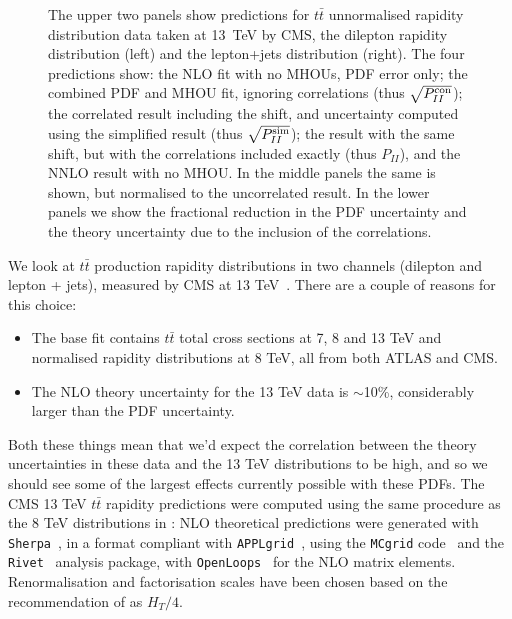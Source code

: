 \begin{figure}[H]
  \caption{The upper two panels show predictions for $t\bar{t}$ unnormalised rapidity distribution data taken at 13~TeV by CMS, the dilepton rapidity distribution \cite{Sirunyan:2018ucr} (left) and the lepton+jets distribution \cite{Sirunyan:2018wem} (right). The four predictions show: the NLO fit with no MHOUs, PDF error only; the combined PDF and MHOU fit, ignoring correlations (thus $\sqrt{P_{II}^{\rm con}}$); the correlated result including the shift, and uncertainty computed using the simplified result (thus $\sqrt{P_{II}^{\rm sim}}$); the result with the same shift, but with the correlations included exactly (thus $P_{II}$), and the NNLO result with no MHOU. In the middle panels the same is shown, but normalised to the uncorrelated result. In the lower panels we show the fractional reduction in the PDF uncertainty and the theory uncertainty due to the inclusion of the correlations.}
  \label{fig:CMSttbar}
\end{figure}

We look at $t\bar{t}$ production rapidity distributions in two channels (dilepton and lepton + jets), measured by CMS at 13 TeV~\cite{Sirunyan:2018ucr,Sirunyan:2018wem}. There are a couple of reasons for this choice:
\begin{itemize}
\item The base fit contains $t\bar{t}$ total cross sections at 7, 8 and 13 TeV and normalised rapidity distributions at 8 TeV, all from both ATLAS and CMS.
\item The NLO theory uncertainty for the 13 TeV data is $\sim$10\%, considerably larger than the PDF uncertainty.
\end{itemize}
Both these things mean that we'd expect the correlation between the theory uncertainties in these data and the 13 TeV distributions to be high, and so we should see some of the largest effects currently possible with these PDFs. The CMS 13 TeV $t\bar{t}$ rapidity predictions were computed using the same procedure as the 8 TeV distributions in \cite{Ball:2017nwa}: NLO theoretical predictions were generated with {\tt Sherpa}~\cite{Gleisberg:2008ta}, in a format compliant with {\tt APPLgrid}~\cite{Carli:2010rw}, using the {\tt MCgrid} 
code~\cite{DelDebbio:2013kxa} and the {\tt Rivet}~\cite{Buckley:2010ar} analysis package, with {\tt OpenLoops}~\cite{Cascioli:2011va} for the NLO 
matrix elements. Renormalisation and factorisation scales have been chosen based on the recommendation of \cite{Czakon:2016dgf} as $H_T/4$.

